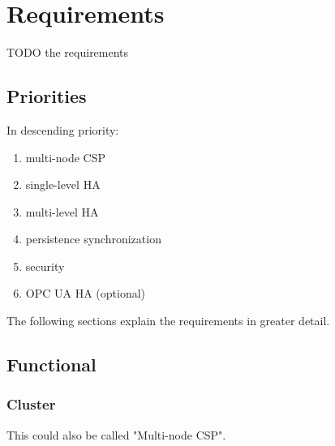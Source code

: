 \chapter{Requirements}
TODO the requirements

\section{Priorities}
In descending priority:

\begin{enumerate}
\item multi-node CSP
\item single-level HA
\item multi-level HA
\item persistence synchronization
\item security
\item OPC UA HA (optional)
\end{enumerate}

The following sections explain the requirements in greater detail.

\section{Functional}


\subsection{Cluster}
This could also be called "Multi-node CSP".

